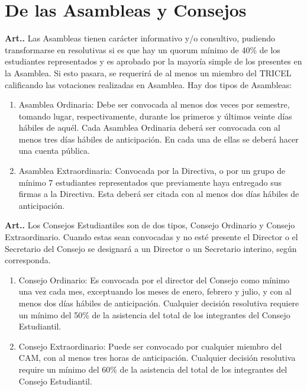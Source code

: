 \documentclass[letterpaper,11pt]{article}
\newcounter{art}
\newenvironment{art}{\refstepcounter{art}\mbox{\textbf{Art.{\space}\theart.}}\ignorespaces}{}
\begin{document}
\section{De las Asambleas y Consejos}\label{asambleasConsejos}
\begin{art}\label{asambleas}
    Las Asambleas tienen carácter informativo y/o consultivo, pudiendo transformarse en resolutivas si es que hay un quorum mínimo de 40\% de los estudiantes representados y es aprobado por la mayoría simple de los presentes en la Asamblea. Si esto pasara, se requerirá de al menos un miembro del TRICEL calificando las votaciones realizadas en Asamblea. Hay dos tipos de Asambleas:
    \begin{enumerate}
        \item Asamblea Ordinaria: Debe ser convocada al menos dos veces por semestre, tomando lugar, respectivamente, durante los primeros y últimos veinte días hábiles de aquél. Cada Asamblea Ordinaria deberá ser convocada con al menos tres días hábiles de anticipación. En cada una de ellas se deberá hacer una cuenta pública.
        \item Asamblea Extraordinaria: Convocada por la Directiva, o por un grupo de mínimo 7 estudiantes representados que previamente haya entregado sus firmas a la Directiva. Esta deberá ser citada con al menos dos días hábiles de anticipación.
    \end{enumerate}
\end{art}

\begin{art}\label{consejos}
    Los Consejos Estudiantiles son de dos tipos, Consejo Ordinario y Consejo Extraordinario. Cuando estas sean convocadas y no esté presente el Director o el Secretario del Consejo se designará a un Director o un Secretario interino, según corresponda.
    \begin{enumerate}
        \item Consejo Ordinario: Es convocada por el director del Consejo como mínimo una vez cada mes, exceptuando los meses de enero, febrero y julio, y con al menos dos días hábiles de anticipación. Cualquier decisión resolutiva requiere un mínimo del 50\% de la asistencia del total de los integrantes del Consejo Estudiantil.
        \item Consejo Extraordinario: Puede ser convocado por cualquier miembro del CAM, con al menos tres horas de anticipación. Cualquier decisión resolutiva require un mínimo del 60\% de la asistencia del total de los integrantes del Consejo Estudiantil.
    \end{enumerate}
\end{art}
\end{document}
